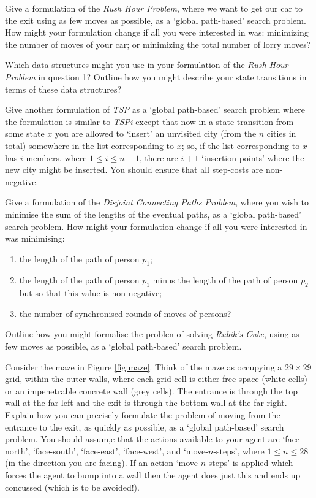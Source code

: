 \question Give a formulation of the \emph{Rush Hour Problem},
where we want to get our car to the exit using as few moves as possible, 
as a ‘global path-based’ search problem. 
How might your formulation change if all you were interested in was: 
minimizing the number of moves of your car; 
or minimizing the total number of lorry moves?

\question Which data structures might you use in your formulation of the \emph{Rush Hour Problem} in question 1? Outline how you might describe your state transitions in terms of these data structures?

\question Give another formulation of \emph{TSP} as a `global path-based' search problem where the formulation is similar to \emph{TSPi} except that now in a state transition from some state $x$ you are allowed to `insert' an unvisited city (from the $n$ cities in total) somewhere in the list corresponding to $x$;
so, if the list corresponding to $x$ has $i$ members,
where $1 \leq i \leq n - 1$,
there are $i + 1$ `insertion points' where the new city might be inserted.
You should ensure that all step-costs are non-negative.

\question Give a formulation of the \emph{Disjoint Connecting Paths Problem}, where you wish to minimise the sum of the lengths of the eventual paths, as a `global path-based' search problem. How might your formulation change if all you were interested in was minimising: 
\begin{enumerate}
    \item the length of the path of person $p_1$;
    \item the length of the path of person $p_1$ minus the length of the path of person $p_2$ but so that this value is non-negative;
    \item the number of synchronised rounds of moves of persons?
\end{enumerate}

\question Outline how you might formalise the problen of solving \emph{Rubik's Cube}, using as few moves as possible, as a `global path-based' search problem.

\question Consider the maze in Figure \ref{fig:maze}. 
Think of the maze as occupying a $29 \times 29$ grid, within the outer walls, where each grid-cell is either free-space (white cells) or an impenetrable concrete wall (grey cells).
The entrance is through the top wall at the far left and the exit is through the bottom wall at the far right.
Explain how you can precisely formulate the problem of moving from the entrance to the exit, 
as quickly as possible, 
as a `global path-based' search problem.
You should assum,e that the actions available to your agent are `face-north', `face-south', `face-east', `face-west', and `move-$n$-steps', where $1 \leq n \leq 28$ (in the direction you are facing). If an action `move-$n$-steps' is applied which forces the agent to bump into a wall then the agent does just this and ends up concussed (which is to be avoided!).

